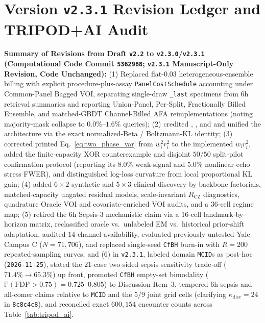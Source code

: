 \documentclass[11pt]{article}
\begin{document}
\clearpage
\section{Version \texttt{v2.3.1} Revision Ledger and TRIPOD+AI Audit}
\label{app:ledger_tripod}

{\sloppy\textbf{Summary of Revisions from Draft \texttt{v2.2} to \texttt{v2.3.0}/\texttt{v2.3.1} (Computational Code Commit \texttt{5362988}; \texttt{v2.3.1} Manuscript-Only Revision, Code Unchanged):} (1) Replaced flat-$0.03$ heterogeneous-ensemble billing with explicit procedure-plus-assay \texttt{PanelCostSchedule} accounting under Common-Panel Bagged VOI, separating single-draw \texttt{\_last} specimens from $6\text{h}$ retrieval summaries and reporting Union-Panel, Per-Split, Fractionally Billed Ensemble, and matched-GBDT Channel-Billed AFA reimplementations (noting majority-mask collapse to $0.0\%\text{--}1.6\%$ queries); (2) credited \citet{buja2005loss}, \citet{turney1995cost}, and \citet{bilgic2011value} and unified the architecture via the exact normalized-Beta / Boltzmann-KL identity; (3) corrected printed Eq.~\eqref{eq:two_phase_var} from $w_i^2 r_i^2$ to the implemented $w_i r_i^2$, added the finite-capacity XOR counterexample and disjoint $50/50$ split-pilot confirmation protocol (reporting its $8.0\%$ weak-signal and $5.0\%$ nonlinear-echo stress FWER), and distinguished log-loss curvature from local proportional KL gain; (4) added $6\times 2$ synthetic and $5\times 3$ clinical discovery-by-backbone factorials, matched-capacity ungated residual models, scale-invariant $R_{\text{CZ}}$ diagnostics, quadrature Oracle VOI and covariate-enriched VOI audits, and a $36$-cell regime map; (5) retired the $6\text{h}$ Sepsis-3 mechanistic claim via a $16$-cell landmark-by-horizon matrix, reclassified oracle vs.\ unlabeled EM vs.\ historical prior-shift adaptation, audited $14$-channel availability, evaluated previously untested Yale Campus C ($N=71{,}706$), and replaced single-seed \texttt{CfBH} burn-in with $R=200$ repeated-sampling curves; and (6) in \texttt{v2.3.1}, labeled domain \texttt{MCID}s as post-hoc (\texttt{2026-11-25}), stated the $21$-case two-sided sepsis sensitivity trade-off ($71.4\% \to 65.3\%$) up front, promoted \texttt{CfBH} empty-set bimodality ($\mathbb{P}(\text{FDP}>0.75)=0.725\text{--}0.805$) to Discussion Item~3, tempered $6\text{h}$ sepsis and all-comer claims relative to \texttt{MCID} and the $5/9$ joint grid cells (clarifying $\kappa_{\text{disc}}=24$ in \texttt{8c8c4c8}), and reconciled exact $600{,}154$ encounter counts across Table~\ref{tab:tripod_ai}.\par}



\clearpage


\end{document}

